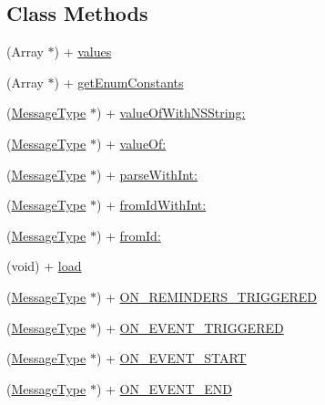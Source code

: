\subsection*{Class Methods}
\begin{DoxyCompactItemize}
\item 
(Array $\ast$) + \hyperlink{interface_message_type_ab04ed1aec839a663aba2ad54305549f5}{values}
\item 
(Array $\ast$) + \hyperlink{interface_message_type_a3f863ec04fea717d59d4d44a0fa7aa14}{get\+Enum\+Constants}
\item 
(\hyperlink{interface_message_type}{Message\+Type} $\ast$) + \hyperlink{interface_message_type_ad42912bb76fab12139f589957803f0cc}{value\+Of\+With\+N\+S\+String\+:}
\item 
(\hyperlink{interface_message_type}{Message\+Type} $\ast$) + \hyperlink{interface_message_type_a2b5672fe087b8caba586af4808f3b539}{value\+Of\+:}
\item 
(\hyperlink{interface_message_type}{Message\+Type} $\ast$) + \hyperlink{interface_message_type_aceffd80132d5bb2176786c069bbfa551}{parse\+With\+Int\+:}
\item 
(\hyperlink{interface_message_type}{Message\+Type} $\ast$) + \hyperlink{interface_message_type_aa9f50a542bd2e25ed84f1b95316050fb}{from\+Id\+With\+Int\+:}
\item 
(\hyperlink{interface_message_type}{Message\+Type} $\ast$) + \hyperlink{interface_message_type_ac074e844de24b4521803110bf03eb155}{from\+Id\+:}
\item 
(void) + \hyperlink{interface_message_type_a6937736fad24223b0ac1ebdec761f9f5}{load}
\item 
(\hyperlink{interface_message_type}{Message\+Type} $\ast$) + \hyperlink{interface_message_type_a4eb7e3a4d74368b106fd6eb3db00d334}{O\+N\+\_\+\+R\+E\+M\+I\+N\+D\+E\+R\+S\+\_\+\+T\+R\+I\+G\+G\+E\+R\+E\+D}
\item 
(\hyperlink{interface_message_type}{Message\+Type} $\ast$) + \hyperlink{interface_message_type_a9d2ad0f76004c4b54fad38d47019fc7f}{O\+N\+\_\+\+E\+V\+E\+N\+T\+\_\+\+T\+R\+I\+G\+G\+E\+R\+E\+D}
\item 
(\hyperlink{interface_message_type}{Message\+Type} $\ast$) + \hyperlink{interface_message_type_ae889e44be12caf6327366da8d7691f7d}{O\+N\+\_\+\+E\+V\+E\+N\+T\+\_\+\+S\+T\+A\+R\+T}
\item 
(\hyperlink{interface_message_type}{Message\+Type} $\ast$) + \hyperlink{interface_message_type_a7073480f7b2a42ab654e946192d033ee}{O\+N\+\_\+\+E\+V\+E\+N\+T\+\_\+\+E\+N\+D}
\end{DoxyCompactItemize}


